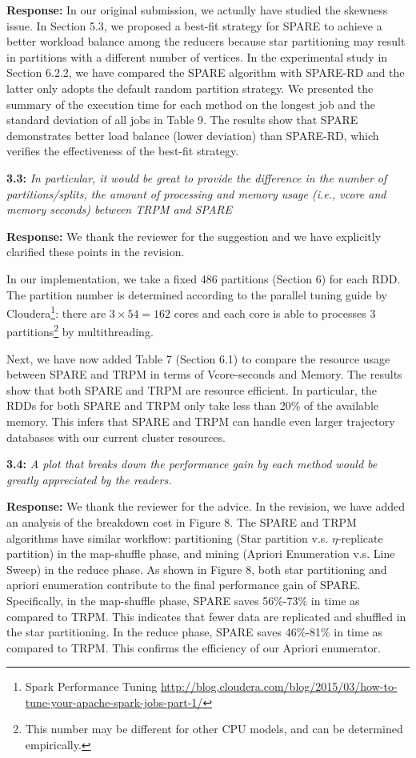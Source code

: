 \documentclass{vldb}
\begin{document}
\textbf{Response:} In our original submission, we actually have studied the skewness issue. In Section 5.3, we proposed a best-fit strategy for SPARE to achieve a better workload balance among the reducers because star partitioning may result in partitions with a different number of vertices. In the experimental study in Section 6.2.2, we have compared the SPARE algorithm with SPARE-RD and the latter only adopts the default random partition strategy. We presented the summary of the execution time for each method on the longest job and the standard deviation of all jobs in Table 9. The results show that SPARE demonstrates better load balance (lower deviation)
than SPARE-RD, which verifies the effectiveness of the best-fit strategy. 


\textbf{3.3:} \emph{In particular, it would be great to provide the
difference in the number of partitions/splits, the amount of processing and
memory usage (i.e., vcore and memory seconds) between TRPM and SPARE}

\textbf{Response:} We thank the reviewer for the suggestion and we have explicitly clarified these points in the revision.

In our implementation, we take a fixed 486 partitions (Section 6)
for each RDD. The partition number is determined according to
the parallel tuning guide by Cloudera\footnote{Spark Performance Tuning \url{http://blog.cloudera.com/blog/2015/03/how-to-tune-your-apache-spark-jobs-part-1/}}: there are  $3\times 54=162$ cores and each core is able to processes 3 partitions\footnote{This number may be different for other CPU models, and can be determined empirically.}
by multithreading.

Next, we have now added Table 7 (Section 6.1) to compare the resource usage between SPARE and TRPM in terms of Vcore-seconds and Memory. The results show that both SPARE and TRPM are resource efficient. In particular, the RDDs for both SPARE and TRPM only take less than 20\% of the available memory. This infers that SPARE and TRPM can handle
even larger trajectory databases with our current cluster resources.



\textbf{3.4:} \emph{A plot that breaks down the performance gain by each method would
be greatly appreciated by the readers.}

\textbf{Response:} We thank the reviewer for the advice. In the revision, we have added an analysis of
the breakdown cost in Figure 8. The SPARE and TRPM algorithms have similar workflow: partitioning (Star partition v.s. $\eta$-replicate partition) in the map-shuffle phase, and  mining (Apriori Enumeration v.s. Line Sweep) in the reduce phase. %
As shown in Figure 8,
both star partitioning and apriori enumeration contribute to 
the final performance gain of SPARE. Specifically, in the map-shuffle phase,
SPARE saves 56\%-73\% in time as compared to TRPM. This indicates that 
fewer data are replicated and shuffled in the star partitioning.
In the reduce phase, SPARE saves 46\%-81\% in time as compared to TRPM. This confirms 
the efficiency of our Apriori enumerator.
\end{document}

